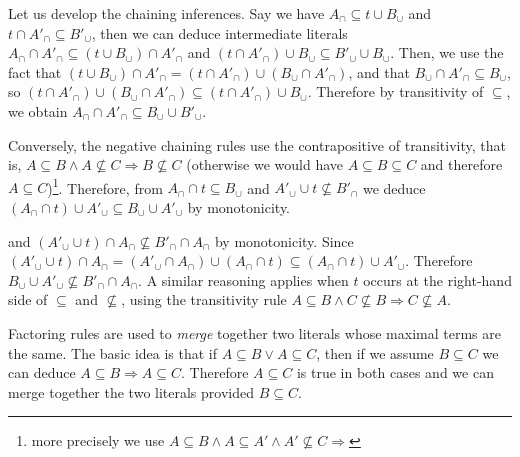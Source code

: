\documentclass{article}
\begin{document}
\begin{prooftree}
\end{prooftree}

Let us develop the chaining inferences. Say we have $A_\cap \subseteq t\cup B_\cup$
and $t \cap A'_\cap \subseteq B'_\cup$, then we can deduce intermediate literals
$A_\cap \cap A'_\cap \subseteq (t \cup B_\cup) \cap A'_\cap$ and
$(t\cap A'_\cap)\cup B_\cup \subseteq B'_\cup \cup B_\cup$. Then, we use the fact that
$(t \cup B_\cup) \cap A'_\cap = (t\cap A'_\cap) \cup (B_\cup\cap A'_\cap)$, and that
$B_\cup \cap A'_\cap \subseteq B_\cup$, so
$(t\cap A'_\cap) \cup (B_\cup\cap A'_\cap) \subseteq (t \cap A'_\cap)\cup B_\cup$.
Therefore by transitivity of $\subseteq$, we obtain
$A_\cap\cap A'_\cap \subseteq B_\cup \cup B'_\cup$.


Conversely, the negative chaining rules use the contrapositive of transitivity,
that is, $A \subseteq B \land A \not\subseteq C \Rightarrow B \not\subseteq C$
(otherwise we would have $A \subseteq B \subseteq C$ and therefore $A \subseteq
C$)\footnote{more precisely we use
$A\subseteq B \land A\subseteq A' \land A' \not\subseteq C \Rightarrow $
}.
Therefore, from $A_\cap \cap t \subseteq B_\cup$ and
$A'_\cup \cup t \not\subseteq B'_\cap$ we
deduce $(A_\cap\cap t)\cup A'_\cup \subseteq B_\cup\cup A'_\cup$ by monotonicity.


and $(A'_\cup\cup t) \cap A_\cap \not\subseteq B'_\cap\cap A_\cap$ by monotonicity.
Since $(A'_\cup \cup t)\cap A_\cap
    = (A'_\cup \cap A_\cap)\cup (A_\cap\cap t)
    \subseteq (A_\cap\cap t) \cup A'_\cup$.
Therefore $B_\cup\cup A'_\cup \not\subseteq B'_\cap\cap A_\cap$.
A similar reasoning applies when $t$ occurs at the right-hand side of
$\subseteq$ and $\not\subseteq$, using the transitivity rule
$A \subseteq B \land C \not\subseteq B \Rightarrow C \not\subseteq A$.

Factoring rules are used to \emph{merge} together two literals whose maximal
terms are the same. The basic idea is that if $A \subseteq B
\lor A \subseteq C$, then if we assume $B\subseteq C$ we can deduce
$A \subseteq B \Rightarrow A \subseteq C$. Therefore $A\subseteq C$ is true
in both cases and we can merge together the two literals provided $B\subseteq C$.
\end{document}
